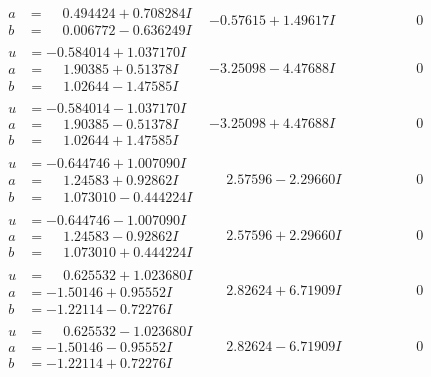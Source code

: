 \documentclass[1p]{elsarticle_modified}
\theoremstyle{definition}
\begin{document}
$$\begin{array}{c|c|c}
\begin{aligned}
a &= \phantom{-}0.494424 + 0.708284 I \\
b &= \phantom{-}0.006772 - 0.636249 I\end{aligned}
 & -0.57615 + 1.49617 I & \phantom{-0.000000 } 0 \\ \hline\begin{aligned}
u &= -0.584014 + 1.037170 I \\
a &= \phantom{-}1.90385 + 0.51378 I \\
b &= \phantom{-}1.02644 - 1.47585 I\end{aligned}
 & -3.25098 - 4.47688 I & \phantom{-0.000000 } 0 \\ \hline\begin{aligned}
u &= -0.584014 - 1.037170 I \\
a &= \phantom{-}1.90385 - 0.51378 I \\
b &= \phantom{-}1.02644 + 1.47585 I\end{aligned}
 & -3.25098 + 4.47688 I & \phantom{-0.000000 } 0 \\ \hline\begin{aligned}
u &= -0.644746 + 1.007090 I \\
a &= \phantom{-}1.24583 + 0.92862 I \\
b &= \phantom{-}1.073010 - 0.444224 I\end{aligned}
 & \phantom{-}2.57596 - 2.29660 I & \phantom{-0.000000 } 0 \\ \hline\begin{aligned}
u &= -0.644746 - 1.007090 I \\
a &= \phantom{-}1.24583 - 0.92862 I \\
b &= \phantom{-}1.073010 + 0.444224 I\end{aligned}
 & \phantom{-}2.57596 + 2.29660 I & \phantom{-0.000000 } 0 \\ \hline\begin{aligned}
u &= \phantom{-}0.625532 + 1.023680 I \\
a &= -1.50146 + 0.95552 I \\
b &= -1.22114 - 0.72276 I\end{aligned}
 & \phantom{-}2.82624 + 6.71909 I & \phantom{-0.000000 } 0 \\ \hline\begin{aligned}
u &= \phantom{-}0.625532 - 1.023680 I \\
a &= -1.50146 - 0.95552 I \\
b &= -1.22114 + 0.72276 I\end{aligned}
 & \phantom{-}2.82624 - 6.71909 I & \phantom{-0.000000 } 0\\

\end{array}$$
\end{document}
